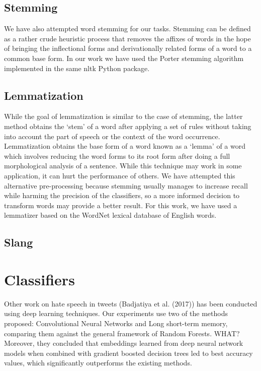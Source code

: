 \documentclass[11pt,a4paper]{article}
\begin{document}
\subsection{Stemming}

We have also attempted word stemming for our tasks. Stemming can be defined as a rather crude heuristic process that removes the affixes of words in the hope of bringing the inflectional forms and derivationally related forms of a word to a common base form. In our work we have used the Porter stemming algorithm implemented in the same nltk Python package.

\subsection{Lemmatization}

While the goal of lemmatization is similar to the case of stemming, the latter method obtains the ‘stem’ of a word after applying a set of rules without taking into account the part of speech or the context of the word occurrence. Lemmatization obtains the base form of a word known as a ‘lemma’ of a word which involves
reducing the word forms to its root form after doing a full morphological analysis of a sentence. While this technique may work in some application, it can hurt the performance of others. We have attempted this alternative pre-processing because stemming usually manages to increase recall while harming the precision of the classifiers, so a more informed decision to transform words may provide a better result. For this work, we have used a lemmatizer based on the WordNet lexical database of English words.

\subsection{Slang}

\section{Classifiers}

Other work on hate speech in tweets (Badjatiya et al. (2017)) has been conducted using deep learning techniques. Our experiments use two of the methods proposed: Convolutional Neural Networks and Long short-term memory, comparing them against the general framework of Random Forests.
WHAT?
Moreover, they concluded that embeddings learned from
deep neural network models when combined with gradient boosted decision trees led to best accuracy values, which significantly outperforms the
existing methods.
\end{document}
